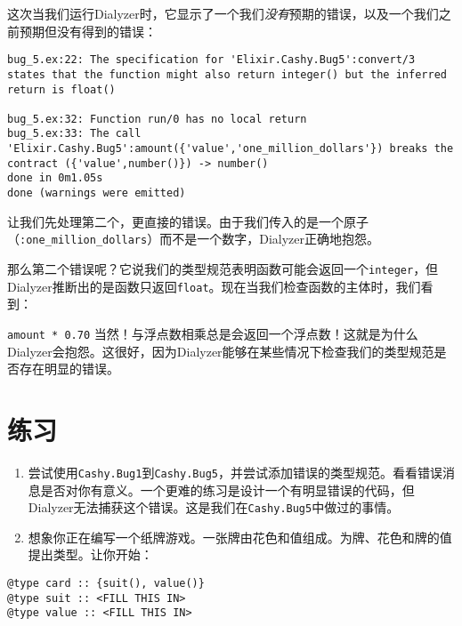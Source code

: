这次当我们运行Dialyzer时，它显示了一个我们\emph{没有}预期的错误，以及一个我们之前预期但没有得到的错误：

\begin{code}{}
\begin{verbatim}
bug_5.ex:22: The specification for 'Elixir.Cashy.Bug5':convert/3 states that the function might also return integer() but the inferred return is float()

bug_5.ex:32: Function run/0 has no local return
bug_5.ex:33: The call 'Elixir.Cashy.Bug5':amount({'value','one_million_dollars'}) breaks the contract ({'value',number()}) -> number()
done in 0m1.05s
done (warnings were emitted)
\end{verbatim}
\end{code}

让我们先处理第二个，更直接的错误。由于我们传入的是一个原子（\texttt{:one\_million\_dollars}）而不是一个数字，Dialyzer正确地抱怨。

那么第二个错误呢？它说我们的类型规范表明函数可能会返回一个\texttt{integer}，但Dialyzer推断出的是函数只返回\texttt{float}。现在当我们检查函数的主体时，我们看到：

\texttt{amount * 0.70}
当然！与浮点数相乘总是会返回一个浮点数！这就是为什么Dialyzer会抱怨。这很好，因为Dialyzer能够在某些情况下检查我们的类型规范是否存在明显的错误。

\section{练习}

\begin{enumerate}
\def\labelenumi{\arabic{enumi}.}
\item
  尝试使用\texttt{Cashy.Bug1}到\texttt{Cashy.Bug5}，并尝试添加错误的类型规范。看看错误消息是否对你有意义。一个更难的练习是设计一个有明显错误的代码，但Dialyzer无法捕获这个错误。这是我们在\texttt{Cashy.Bug5}中做过的事情。
\item
  想象你正在编写一个纸牌游戏。一张牌由花色和值组成。为牌、花色和牌的值提出类型。让你开始：
\end{enumerate}

\begin{code}{}
\begin{verbatim}
@type card :: {suit(), value()} 
@type suit :: <FILL THIS IN> 
@type value :: <FILL THIS IN>
\end{verbatim}
\end{code}

